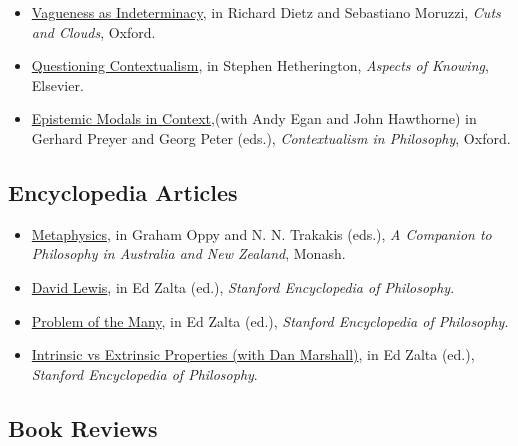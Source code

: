 \documentclass[
  10pt,
  letterpaper,
  DIV=11,
  numbers=noendperiod,
  twoside]{scrartcl}
\providecommand{\tightlist}{%
  \setlength{\itemsep}{0pt}\setlength{\parskip}{0pt}}\usepackage{longtable,booktabs,array}
\begin{document}
\begin{itemize}
\item
  \href{https://brian.weatherson.org/quarto/posts/vai/vagueness-as-indeterminacy.html}{Vagueness
  as Indeterminacy}, in Richard Dietz and Sebastiano Moruzzi, \emph{Cuts
  and Clouds}, Oxford.
\item
  \href{https://brian.weatherson.org/quarto/posts/qc/questioning-contextualism.html}{Questioning
  Contextualism}, in Stephen Hetherington, \emph{Aspects of Knowing},
  Elsevier.
\item
  \href{https://brian.weatherson.org/quarto/posts/epic/epistemic-modals-in-context.html}{Epistemic
  Modals in Context},(with Andy Egan and John Hawthorne) in Gerhard
  Preyer and Georg Peter (eds.), \emph{Contextualism in Philosophy},
  Oxford.
\end{itemize}

\subsection{Encyclopedia Articles}\label{encyclopedia-articles}

\begin{itemize}
\tightlist
\item
  \href{http://www.publishing.monash.edu/cpanz/}{Metaphysics}, in Graham
  Oppy and N. N. Trakakis (eds.), \emph{A Companion to Philosophy in
  Australia and New Zealand}, Monash.
\item
  \href{http://plato.stanford.edu/entries/david-lewis/}{David Lewis}, in
  Ed Zalta (ed.), \emph{Stanford Encyclopedia of Philosophy}.
\item
  \href{http://plato.stanford.edu/entries/problem-of-many/}{Problem of
  the Many}, in Ed Zalta (ed.), \emph{Stanford Encyclopedia of
  Philosophy}.
\item
  \href{http://plato.stanford.edu/entries/intrinsic-extrinsic/}{Intrinsic
  vs Extrinsic Properties (with Dan Marshall)}, in Ed Zalta (ed.),
  \emph{Stanford Encyclopedia of Philosophy}.
\end{itemize}

\subsection{Book Reviews}\label{book-reviews}
\end{document}
